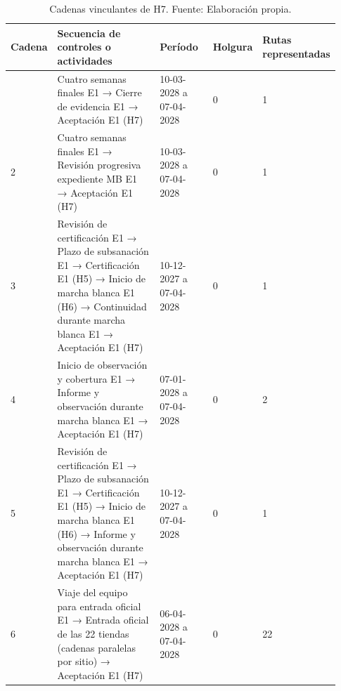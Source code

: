 \documentclass[11pt]{article}
\begin{document}
\begingroup
\small
\begin{longtable}{@{}p{0.07\linewidth}p{0.53\linewidth}p{0.19\linewidth}p{0.06\linewidth}p{0.08\linewidth}@{}}
\caption[Cadenas vinculantes de H7]{Cadenas vinculantes de H7. Fuente: Elaboración propia.}\label{tab:t15-cadenas-H7}\\
\toprule
\textbf{Cadena} & \textbf{Secuencia de controles o actividades} & \textbf{Período} & \textbf{Holgura} & \textbf{Rutas representadas} \\
\midrule
\endhead
\bottomrule
\endlastfoot
1 & Cuatro semanas finales E1 → Cierre de evidencia E1 → Aceptación E1 (H7) & 10-03-2028 a 07-04-2028 & 0 & 1 \\
2 & Cuatro semanas finales E1 → Revisión progresiva expediente MB E1 → Aceptación E1 (H7) & 10-03-2028 a 07-04-2028 & 0 & 1 \\
3 & Revisión de certificación E1 → Plazo de subsanación E1 → Certificación E1 (H5) → Inicio de marcha blanca E1 (H6) → Continuidad durante marcha blanca E1 → Aceptación E1 (H7) & 10-12-2027 a 07-04-2028 & 0 & 1 \\
4 & Inicio de observación y cobertura E1 → Informe y observación durante marcha blanca E1 → Aceptación E1 (H7) & 07-01-2028 a 07-04-2028 & 0 & 2 \\
5 & Revisión de certificación E1 → Plazo de subsanación E1 → Certificación E1 (H5) → Inicio de marcha blanca E1 (H6) → Informe y observación durante marcha blanca E1 → Aceptación E1 (H7) & 10-12-2027 a 07-04-2028 & 0 & 1 \\
6 & Viaje del equipo para entrada oficial E1 → Entrada oficial de las 22 tiendas (cadenas paralelas por sitio) → Aceptación E1 (H7) & 06-04-2028 a 07-04-2028 & 0 & 22 \\
\end{longtable}
\endgroup
\end{document}
